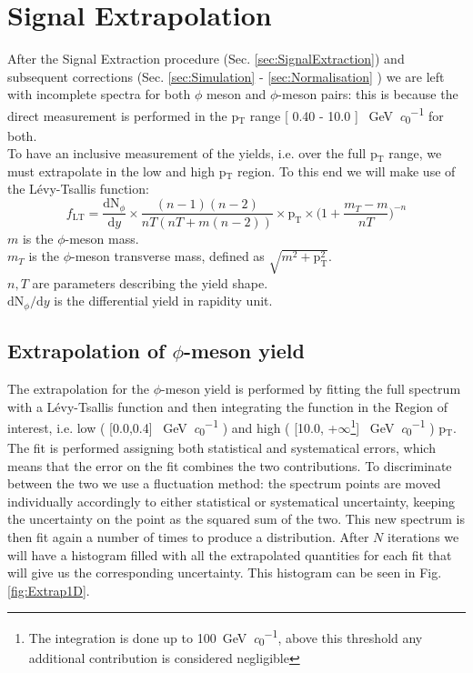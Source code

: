 \section{Signal Extrapolation}
\label{sec:SignalExtrapolation}
After the Signal Extraction procedure (Sec. \ref{sec:SignalExtraction}) and subsequent corrections (Sec. \ref{sec:Simulation} - \ref{sec:Normalisation} ) we are left with incomplete spectra for both $\phi$ meson and $\phi$-meson pairs: this is because the direct measurement is performed in the p$_{\text{T}}$ range [ 0.40 - 10.0 ] \SI{}{\giga\electronvolt\per\clight} for both.\\
\indent To have an inclusive measurement of the yields, i.e. over the full p$_{\text{T}}$ range, we must extrapolate in the low and high p$_{\text{T}}$ region. To this end we will make use of the L\'evy-Tsallis function:
\begin{equation}
f_{\text{LT}} = \frac{\text{dN}_{\phi}}{\text{d}y}\times\frac{(n-1)(n-2)}{nT(nT+m(n-2))}\times\text{p}_{\text{T}}\times\Big( 1+ \frac{m_{T} -m}{nT} \Big)^{-n}
\label{eq:levy-tsallis}
\end{equation}
\textbf{$m$} is the $\phi$-meson mass.\\
\textbf{$m_{T}$} is the $\phi$-meson transverse mass, defined as $\sqrt{m^2+\text{p}_{\text{T}}^2}$.\\
\textbf{$n, T$} are parameters describing the yield shape.\\
\textbf{$\text{dN}_{\phi}/\text{d}y$} is the differential yield in rapidity unit.\\

\subsection{Extrapolation of $\phi$-meson yield}
The extrapolation for the $\phi$-meson yield is performed by fitting the full spectrum with a L\'evy-Tsallis function and then integrating the function in the Region of interest, i.e. low ( [0.0,0.4] \SI{}{\giga\electronvolt\per\clight} ) and high ( [10.0, +$\infty$\footnote{The integration is done up to \SI{100}{\giga\electronvolt\per\clight}, above this threshold any additional contribution is considered negligible}] \SI{}{\giga\electronvolt\per\clight} ) p$_{\text{T}}$. The fit is performed assigning both statistical and systematical errors, which means that the error on the fit combines the two contributions. To discriminate between the two we use a fluctuation method: the spectrum points are moved individually accordingly to either statistical or systematical uncertainty, keeping the uncertainty on the point as the squared sum of the two. This new spectrum is then fit again a number of times to produce a distribution. After $N$ iterations we will have a histogram filled with all the extrapolated quantities for each fit that will give us the corresponding uncertainty. This histogram can be seen in Fig. \ref{fig:Extrap1D}.

